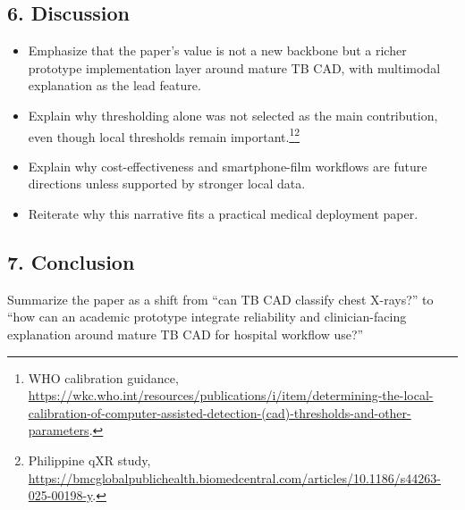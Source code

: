 \documentclass[11pt]{article}
\begin{document}
\subsection{6. Discussion}

\begin{itemize}[leftmargin=1.5em]
    \item Emphasize that the paper's value is not a new backbone but a richer prototype implementation layer around mature TB CAD, with multimodal explanation as the lead feature.
    \item Explain why thresholding alone was not selected as the main contribution, even though local thresholds remain important.\footnote{WHO calibration guidance, \url{https://wkc.who.int/resources/publications/i/item/determining-the-local-calibration-of-computer-assisted-detection-(cad)-thresholds-and-other-parameters}.}\footnote{Philippine qXR study, \url{https://bmcglobalpublichealth.biomedcentral.com/articles/10.1186/s44263-025-00198-y}.}
    \item Explain why cost-effectiveness and smartphone-film workflows are future directions unless supported by stronger local data.
    \item Reiterate why this narrative fits a practical medical deployment paper.
\end{itemize}

\subsection{7. Conclusion}

Summarize the paper as a shift from ``can TB CAD classify chest X-rays?'' to ``how can an academic prototype integrate reliability and clinician-facing explanation around mature TB CAD for hospital workflow use?''
\end{document}

